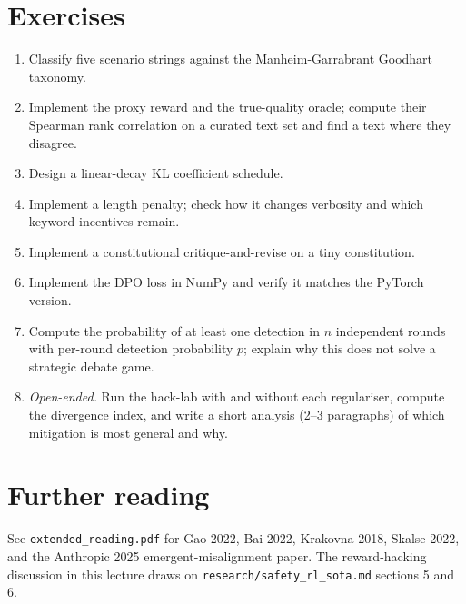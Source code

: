 \documentclass[11pt,oneside]{scrbook}
\begin{document}
\chapter{Exercises}

\begin{enumerate}\setlength{\itemsep}{2pt}
  \item[\textbf{\textcolor{rlteal}{$\bigstar$}}]
        Classify five scenario strings against the Manheim-Garrabrant
        Goodhart taxonomy.
  \item[\textbf{\textcolor{rlteal}{$\bigstar\bigstar$}}]
        Implement the proxy reward and the true-quality oracle; compute
        their Spearman rank correlation on a curated text set and find
        a text where they disagree.
  \item[\textbf{\textcolor{rlteal}{$\bigstar\bigstar$}}]
        Design a linear-decay KL coefficient schedule.
  \item[\textbf{\textcolor{rlteal}{$\bigstar\bigstar$}}]
        Implement a length penalty; check how it changes verbosity and which
        keyword incentives remain.
  \item[\textbf{\textcolor{rlteal}{$\bigstar\bigstar$}}]
        Implement a constitutional critique-and-revise on a tiny constitution.
  \item[\textbf{\textcolor{rlteal}{$\bigstar\bigstar$}}]
        Implement the DPO loss in NumPy and verify it matches the PyTorch version.
  \item[\textbf{\textcolor{rlteal}{$\bigstar\bigstar$}}]
        Compute the probability of at least one detection in $n$ independent
        rounds with per-round detection probability $p$; explain why this
        does not solve a strategic debate game.
  \item[\textbf{\textcolor{rlteal}{$\bigstar\bigstar\bigstar$}}]
        \emph{Open-ended.} Run the hack-lab with and without each
        regulariser, compute the divergence index, and write a short
        analysis (2--3 paragraphs) of which mitigation is most general
        and why.
\end{enumerate}

\chapter{Further reading}

See \texttt{extended\_reading.pdf} for Gao 2022, Bai 2022, Krakovna 2018,
Skalse 2022, and the Anthropic 2025 emergent-misalignment paper.
The reward-hacking discussion in this lecture draws on
\texttt{research/safety\_rl\_sota.md} sections 5 and 6.
\end{document}
